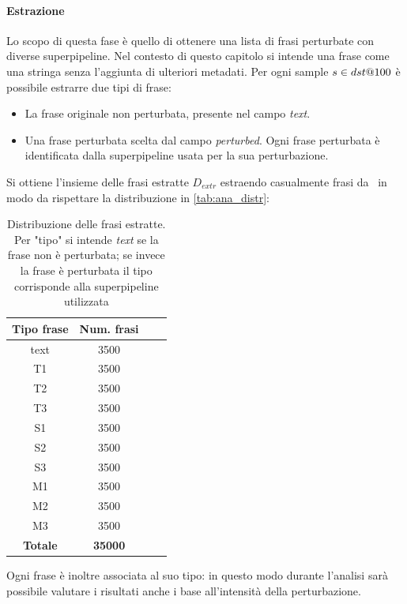 \paragraph{Estrazione}
Lo scopo di questa fase è quello di ottenere una lista di frasi perturbate con diverse superpipeline. Nel contesto di questo capitolo si intende una frase come una stringa senza l'aggiunta di ulteriori metadati. Per ogni sample $s \in dst@100$ è possibile estrarre due tipi di frase:
\begin{itemize}
\item La frase originale non perturbata, presente nel campo \textit{text}.
\item Una frase perturbata scelta dal campo \textit{perturbed}. Ogni frase perturbata è identificata dalla superpipeline usata per la sua perturbazione.
\end{itemize}
Si ottiene l'insieme delle frasi estratte $D_{extr}$ estraendo casualmente frasi da \dstb\ in modo da rispettare la distribuzione in \autoref{tab:ana_distr}:
\begin{table}[H]
\centering
\begin{tabular}{cccc}
\textbf{Tipo frase} & \textbf{Num. frasi} \\
\hline
text & 3500 \\
T1 & 3500 \\
T2 & 3500 \\
T3 & 3500 \\
S1 & 3500 \\
S2 & 3500 \\
S3 & 3500 \\
M1 & 3500 \\
M2 & 3500 \\
M3 & 3500 \\ 
\hline
\textbf{Totale} & \textbf{35000}
\end{tabular}
\caption{Distribuzione delle frasi estratte. Per "tipo" si intende \textit{text} se la frase non è perturbata; se invece la frase è perturbata il tipo corrisponde alla superpipeline utilizzata}
\label{tab:ana_distr}
\end{table}
Ogni frase è inoltre associata al suo tipo: in questo modo durante l'analisi sarà possibile valutare i risultati anche i base all'intensità della perturbazione.

